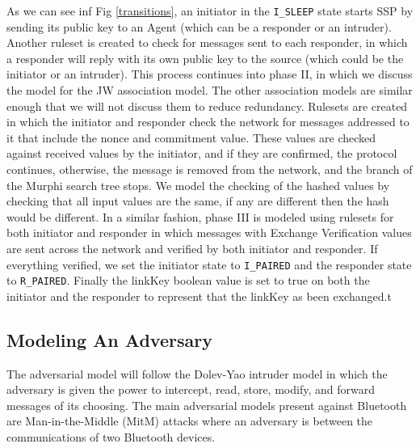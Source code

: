 \documentclass{acm_proc_article-sp}
\begin{document}
As we can see inf Fig \ref{transitions}, an initiator in the \texttt{I\_SLEEP} state starts SSP by sending its public key to an Agent (which can be a responder or an intruder). Another ruleset is created to check for messages sent to each responder, in which a responder will reply with its own public key to the source (which could be the initiator or an intruder). This process continues into phase II, in which we discuss the model for the JW association model. The other association models are similar enough that we will not discuss them to reduce redundancy. Rulesets are created in which the initiator and responder check the network for messages addressed to it that include the nonce and commitment value. These values are checked against received values by the initiator, and if they are confirmed, the protocol continues, otherwise, the message is removed from the network, and the branch of the Murphi search tree stops. We model the checking of the hashed values by checking that all input values are the same, if any are different then the hash would be different. In a similar fashion, phase III is modeled using rulesets for both initiator and responder in which messages with Exchange Verification values are sent across the network and verified by both initiator and responder. If everything verified, we set the initiator state to \texttt{I\_PAIRED} and the responder state to \texttt{R\_PAIRED}. Finally the linkKey boolean value is set to true on both the initiator and the responder to represent that the linkKey as been exchanged.t

\subsection{Modeling An Adversary}
The adversarial model will follow the Dolev-Yao intruder model\cite{dolev:yao} in which the adversary is given the power to intercept, read, store, modify, and forward messages of its choosing. The main adversarial models present against Bluetooth are Man-in-the-Middle (MitM) attacks where an adversary is between the communications of two Bluetooth devices.
\end{document}
